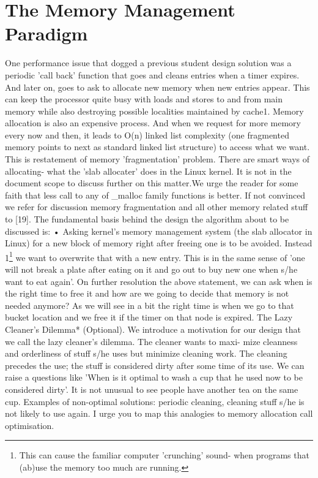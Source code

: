 \section{The Memory Management Paradigm}
One performance issue that dogged a previous student design solution was a
periodic ’call back’ function that goes and cleans entries when a timer expires. And
later on, goes to ask to allocate new memory when new entries appear. This can
keep the processor quite busy with loads and stores to and from main memory
while also destroying possible localities maintained by cache1. Memory allocation
is also an expensive process. And when we request for more memory every now
and then, it leads to O(n) linked list complexity (one fragmented memory points to
next as standard linked list structure) to access what we want. This is restatement
of memory ’fragmentation’ problem. There are smart ways of allocating- what the
’slab allocater’ does in the Linux kernel. It is not in the document scope to discuss
further on this matter.We urge the reader for some faith that less call to any of
\_malloc family functions is better. If not convinced we refer for discussion memory
fragmentation and all other memory related stuff to [19].
The fundamental basis behind the design the algorithm about to be discussed
is:
• Asking kernel’s memory management system (the slab allocator in Linux)
for a new block of memory right after freeing one is to be avoided. Instead
1\footnote{This can cause the familiar computer ’crunching’ sound- when programs that (ab)use the memory
too much are running.}
we want to overwrite that with a new entry. This is in the same sense of
’one will not break a plate after eating on it and go out to buy new one
when s/he want to eat again’.
On further resolution the above statement, we can ask when is the right time to
free it and how are we going to decide that memory is not needed anymore? As we
will see in a bit the right time is when we go to that bucket location and we free it
if the timer on that node is expired.
The Lazy Cleaner’s Dilemma* (Optional). We introduce a motivation
for our design that we call the lazy cleaner’s dilemma. The cleaner wants to maxi-
mize cleanness and orderliness of stuff s/he uses but minimize cleaning work. The
cleaning precedes the use; the stuff is considered dirty after some time of its use.
We can raise a questions like ’When is it optimal to wash a cup that he used now to
be considered dirty’. It is not unusual to see people have another tea on the same
cup. Examples of non-optimal solutions: periodic cleaning, cleaning stuff s/he is
not likely to use again. I urge you to map this analogies to memory allocation call
optimisation.
